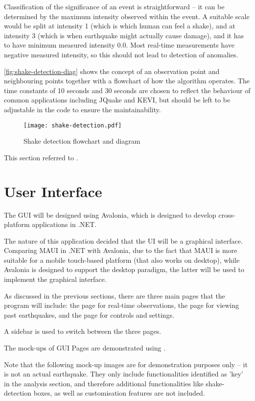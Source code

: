 Classification of the significance of an event is straightforward -- it can be determined by the maximum intensity observed within the event. A suitable scale would be split at intensity 1 (which is which human can feel a shake), and at intensity 3 (which is when earthquake might actually cause damage), and it has to have minimum measured intensity 0.0. Most real-time measurements have negative measured intensity, so this should not lead to detection of anomalies.

\autoref{fig:shake-detection-diag} shows the concept of an observation point and neighbouring points together with a flowchart of how the algorithm operates. The time constants of 10 seconds and 30 seconds are chosen to reflect the behaviour of common applications including JQuake and KEVI, but should be left to be adjustable in the code to ensure the maintainability.

\begin{figure}[htp]
    \centering
    \texttt{[image: shake-detection.pdf]}
    \caption{Shake detection flowchart and diagram}
    \label{fig:shake-detection-diag}
\end{figure}

This section referred to \autocite{blog-ingen-shake-detection}.

\section{User Interface}

The GUI will be designed using Avalonia, which is designed to develop cross-platform applications in .NET.

The nature of this application decided that the UI will be a graphical interface. Comparing MAUI in .NET with Avalonia, due to the fact that MAUI is more suitable for a mobile touch-based platform (that also works on desktop), while Avalonia is designed to support the desktop paradigm, the latter will be used to implement the graphical interface.

As discussed in the previous sections, there are three main pages that the program will include: the page for real-time observations, the page for viewing past earthquakes, and the page for controls and settings.

A sidebar is used to switch between the three pages.

The mock-ups of GUI Pages are demonstrated using \autocite{soft-balsamiq}.

Note that the following mock-up images are for demonstration purposes only -- it is not an actual earthquake. They only include functionalities identified as 'key' in the analysis section, and therefore additional functionalities like shake-detection boxes, as well as customisation features are not included.

